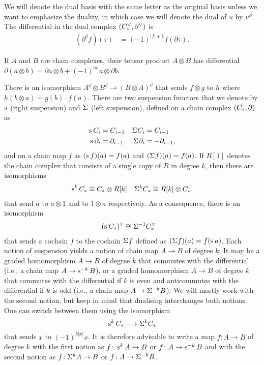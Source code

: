 We will denote the dual basis with the same letter as the original basis unless we want to emphasize the duality, in which case we will denote the dual of $u$ by $u^\dd$. The differential in the dual complex $(\ucocadenas,\partial^\dd)$ is
\begin{align*}
	(\partial^\dd f)(\tau) &= (-1)^{|f|+1} f(\partial \tau). %
\end{align*}
\begin{convention} 
	If $A$ and $B$ are chain complexes, their tensor product $A\otimes B$ has differential $\partial(a\otimes b) = \partial a\otimes b + (-1)^{|a|}a\otimes \partial b$. 
\end{convention}
	There is an isomorphism $A^\dd\otimes B^\dd\to (B\otimes A)^{\dd}$ that sends $f\otimes g$ to $h$ where $h(b\otimes a) = g(b)\cdot f(a)$. There are two suspension functors that we denote by $\sus{}$ (right suspension) and $\susp{}$ (left suspension), defined on a chain complex $(\ucadenas,\partial)$ as
\begin{align*}
	\sus{} \ucadenas[i] &= \ucadenas[i-1] & \susp{} \ucadenas[i] &= \ucadenas[i-1] \\
	\sus{} \partial_i &= \partial_{i-1} & \susp{} \partial_i &= -\partial_{i-1}, 
\end{align*}
and on a chain map $f$ as $(\sus{}f)(a) = f(a)$ and $(\susp{} f)(a) = f(a)$. If $R[1]$ denotes the chain complex that consists of a single copy of $R$ in degree $k$, then there are isomorphisms
\begin{align*}
	\sus{k} \ucadenas &\cong \ucadenas\otimes R[k] & \susp{k} \ucadenas \cong R[k]\otimes \ucadenas.
\end{align*}
that send $a$ to $a\otimes 1$ and to $1\otimes a$ respectively. As a consequence, there is an isomorphism
\begin{align*}
(\sus{}\ucadenas )^\dd &\cong \susp{-1}\ucocadenas
\end{align*} 
that sends a cochain $f$ to the cochain $\susp{}f$ defined as $(\susp{}f)(a) = f(\sus{}a)$.
Each notion of suspension yields a notion of chain map $A\to B$ of degree $k$: It may be a graded homomorphism $A\to B$ of degree $k$ that commutes with the differential (i.e., a chain map $A\to \sus{-k} B$), or a graded homomorphism $A\to B$ of degree $k$ that commutes with the differential if $k$ is even and anticommutes with the differential if $k$ is odd (i.e., a chain map $A\to \susp{-k}B$). We will mostly work with the second notion, but keep in mind that dualising interchanges both notions. One can switch between them using the isomorphism
\[
	\sus{k}\ucadenas \lra \susp{k}\ucadenas
\]
that sends $x$ to $(-1)^{k|x|}x$. It is therefore advisable to write a map $f\colon A\to B$ of degree $k$ with the first notion as $f\colon \sus{k}A\to B$ or $f\colon A\to \sus{-k}B$ and with the second notion as $f\colon \susp{k}A\to B$ or $f\colon A\to \susp{-k}B$.


